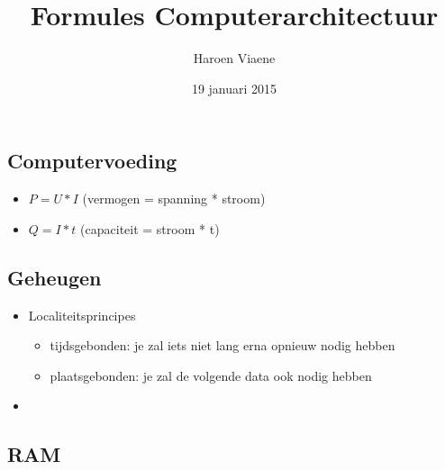 \documentclass[11pt]{article}
\title{Formules Computerarchitectuur}
\author{Haroen Viaene}
\date{19 januari 2015}
\let\originalitem\item
\renewcommand{\item}{\originalitem[]}
\newcommand{\Newpage}{\end{preview}\begin{preview}}
\begin{document}
\begin{preview}


\maketitle

\Newpage

\section{Computervoeding}

\begin{itemize}
	\item $P = U * I$ (vermogen = spanning * stroom)
	\item $Q = I * t$ (capaciteit = stroom * t)
\end{itemize}

\Newpage

\section{Geheugen}

\begin{itemize}
	\item Localiteitsprincipes
	\begin{itemize}
		\item tijdsgebonden: je zal iets niet lang erna opnieuw nodig hebben
		\item plaatsgebonden: je zal de volgende data ook nodig hebben
	\end{itemize}
	\item 
\end{itemize}

\subsection{RAM}


\end{preview}
\end{document}
